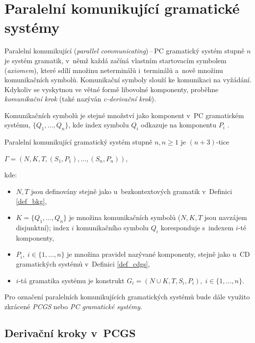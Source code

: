 \section{Paralelní komunikující gramatické systémy}
Paralelní komunikující (\emph{parallel communicating})\,--\,PC gramatický systém stupně $n$ je systém gramatik, v~němž každá začíná vlastním startovacím symbolem (\emph{axiomem}), které sdílí množinu neterminálů i~terminálů a~nově množinu komunikačních symbolů.
Komunikační symboly slouží ke komunikaci na vyžádání.
Kdykoliv se vyskytnou ve větné formě libovolné komponenty, proběhne \emph{komunikační krok} (také nazýván \emph{c-derivační krok}).

Komunikačních symbolů je stejné množství jako komponent v~PC gramatickém systému, $\{Q_1, \ldots, Q_n\}$, kde index symbolu $Q_i$ odkazuje na komponentu $P_i$ \cite{PCGS-chapter2}.
\begin{definition}
    Paralelní komunikující gramatický systém stupně $n, n \geq 1$ je $(n+3)$-tice
    \begin{center}
        $\Gamma = (N, K, T, (S_1, P_1), \ldots, (S_n, P_n))$,
    \end{center}
    kde:
    \begin{itemize}
        \item $N, T$ jsou definovány stejně jako u~bezkontextových gramatik v~Definici \ref{def_bkg},
        \item $K = \{Q_1, \ldots, Q_n\}$ je množina komunikačních symbolů ($N, K, T$ jsou navzájem disjunktní); index $i$ komunikačního symbolu $Q_i$ koresponduje s~indexem $i$-té komponenty,
        \item $P_i,\; i \in \{1, \ldots, n\}$ je množina pravidel nazývané komponenty, stejně jako u~CD gramatických systémů v~Definici \ref{def_cdgs},
        \item $i$-tá gramatika systému je konstrukt $G_i = (N \cup K, T, S_i, P_i),\; i \in \{1, \ldots, n\}$.
    \end{itemize}
\end{definition}

\begin{convention}
Pro označení paralelních komunikujících gramatických systémů bude dále využito zkrácené \emph{PCGS} nebo \emph{PC gramatické systémy}.
\end{convention}

\subsection*{Derivační kroky v~PCGS}

